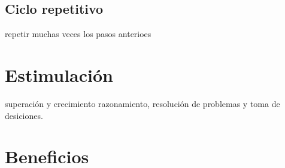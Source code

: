 \subsection{Ciclo repetitivo}
repetir muchas veces los pasos anterioes

\section{Estimulaci\'on}
superaci\'on y crecimiento
razonamiento, resoluci\'on de problemas y toma de desiciones.
\section{Beneficios}

